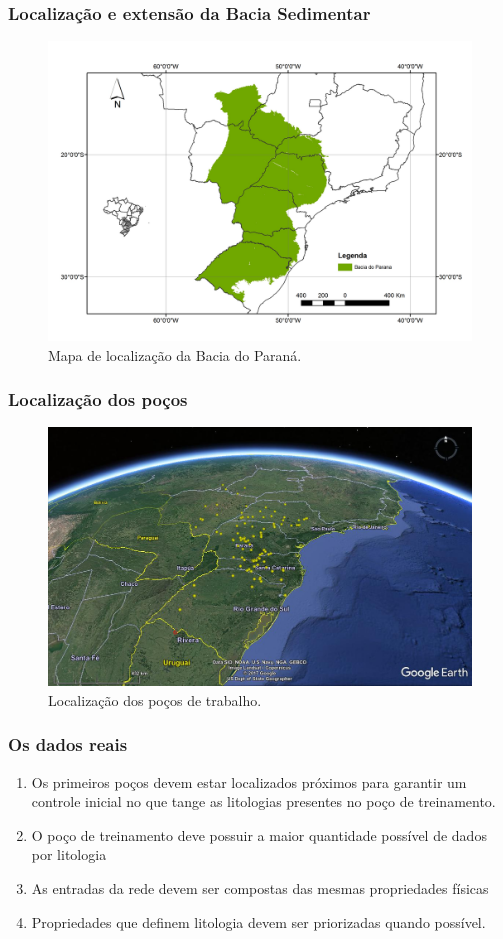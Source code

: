 \documentclass[aspectratio=10]{beamer} %
\begin{document}
\begin{frame}
\frametitle{Localização e extensão da Bacia Sedimentar}
\begin{figure}[H]
\centering
\includegraphics[scale=0.3]{Imagens/BaciaParana.jpg}
\caption{Mapa de localização da Bacia do Paraná. }
\label{mapa geologico}
\end{figure}
\end{frame}

\begin{frame}
\frametitle{Localização dos poços}
\begin{figure}[H]
\centering
\includegraphics[scale=0.25]{Imagens/Pocos2.png}
\caption{Localização dos poços de trabalho.}
\label{real}
\end{figure}
\end{frame}

\begin{frame}
\frametitle{Os dados reais}
\begin{enumerate}
	\item Os primeiros poços devem estar localizados próximos para garantir um controle inicial no que tange as litologias presentes no poço de treinamento. 
	\pause
	\item O poço de treinamento deve possuir a maior quantidade possível de dados por litologia
	\pause
	\item As entradas da rede devem ser compostas das mesmas propriedades físicas
	\pause
	\item Propriedades que definem litologia devem ser priorizadas quando possível.
\end{enumerate}
\end{frame}
\end{document}
